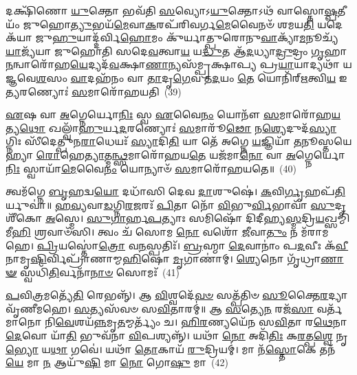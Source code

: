 𑌦𑌕𑍍𑌷𑌿᳴𑌣𑍋 \ul{𑌯𑍁}\-𑌕𑍍𑌤𑍋 𑌭𑌵᳴𑌤𑌿 \ul{𑌸}\-𑌵𑍍𑌯𑍋\-𑌽\-\ul{𑌯𑍁}\-𑌕𑍍𑌤𑍋\-𑌽𑌥᳴ 𑌵𑌾𑌸𑍍𑌤𑍋\-\ul{𑌷𑍍𑌪}\-𑌤𑍀𑌯𑌂᳴ 𑌜𑍁𑌹𑍋\-\ul{𑌤𑍍𑌯𑍁}\-𑌭𑌯᳴\-\ul{𑌮𑍇}\-𑌵𑌾\-\ul{𑌕}\-𑌰𑌪᳴𑌰𑌿𑌵𑌰𑍍𑌗\-\ul{𑌮𑍇}\-𑌵𑍈𑌨𑍞᳴ 𑌶𑌮𑌯\-\ul{𑌤𑌿} 𑌯𑌦𑍇𑌕᳴𑌯𑌾 𑌜𑍁\-\ul{𑌹𑍁}\-𑌯𑌾𑌦𑍍𑌦᳴𑌰𑍍𑌵𑌿\-\ul{𑌹𑍋}\-𑌮𑌂 𑌕𑍁᳴𑌰𑍍𑌯𑌾𑌤𑍍𑌪𑍁𑌰𑍋𑌨𑍁\-\ul{𑌵𑌾}\-𑌕𑍍𑌯𑌾᳴\-\ul{𑌮}\-𑌨𑍂𑌚𑍍𑌯᳴ \ul{𑌯𑌾}\-𑌜𑍍𑌯᳴𑌯𑌾 𑌜𑍁𑌹𑍋𑌤𑌿 𑌸𑌦𑍇\-\ul{𑌵}\-𑌤𑍍𑌵𑌾\-\ul{𑌯} 𑌯\-\ul{𑌦𑍍𑌧𑍁}\-𑌤 𑌆᳴\-\ul{𑌦}\-𑌧𑍍𑌯𑌾\-\ul{𑌦𑍍𑌰𑍁}\-𑌦𑍍𑌰𑌂 \ul{𑌗𑍃}\-𑌹𑌾\-\ul{𑌨}\-𑌨𑍍𑌵𑌾𑌰𑍋᳴𑌹\-\ul{𑌯𑍇}\-𑌦𑍍𑌯𑌦᳴\-\ul{𑌵}\-\-𑌕𑍍𑌷𑌾\-\ul{𑌣𑌾}\-𑌨𑍍𑌯𑌸᳴𑌮𑍍𑌪𑍍𑌰𑌕𑍍𑌷𑌾𑌪𑍍𑌯 𑌪𑍍𑌰\-\ul{𑌯𑌾}\-𑌯𑌾𑌦𑍍𑌯𑌥𑌾᳴ 𑌯𑌜𑍍𑌞𑌵𑍇\-\ul{𑌶}\-𑌸𑌂 \ul{𑌵𑌾}\-𑌦𑌹᳴𑌨𑌂 𑌵𑌾 \ul{𑌤𑌾}\-𑌦𑍃\-\ul{𑌗𑍇}\-𑌵 𑌤\-\ul{𑌦}\-𑌯𑌂 \ul{𑌤𑍇} 𑌯𑍋𑌨𑌿᳴𑌰𑍍\mbox{}\-\ul{𑌋}\-𑌤𑍍𑌵𑌿\-\ul{𑌯} 𑌇\-\ul{𑌤𑍍𑌯}\-𑌰𑌣𑍍𑌯𑍋𑌃॑ \ul{𑌸}\-𑌮𑌾𑌰𑍋᳴𑌹𑌯𑌤𑌿~(39)

\-\ul{𑌏}\-𑌷 𑌵𑌾 \ul{𑌅}\-𑌗𑍍𑌨𑍇𑌰𑍍𑌯𑍋\-\ul{𑌨𑌿𑌃} 𑌸𑍍𑌵 \ul{𑌏}\-𑌵𑍈\-\ul{𑌨𑌂} 𑌯𑍋𑌨𑍗᳴ \ul{𑌸}\-𑌮𑌾𑌰𑍋᳴𑌹\-\ul{𑌯}\-𑌤𑍍𑌯\-\ul{𑌥𑍋} 𑌖𑌲𑍍𑌵𑌾᳴\-\ul{𑌹𑍁}\-𑌰𑍍𑌯\-\ul{𑌦}\-𑌰𑌣𑍍𑌯𑍋𑌃॑ \ul{𑌸}\-𑌮𑌾𑌰𑍂᳴\-\ul{𑌢𑍋} 𑌨\-\ul{𑌶𑍍𑌯𑍇}\-𑌦𑍁𑌦᳴\-\ul{𑌸𑍍𑌯𑌾}\-𑌗𑍍𑌨𑌿𑌃 𑌸𑍀᳴𑌦𑍇𑌤𑍍𑌪𑍁𑌨\-\ul{𑌰𑌾}\-𑌧𑍇𑌯𑌃᳴ \ul{𑌸𑍍𑌯𑌾}\-𑌦𑌿\-\ul{𑌤𑌿} 𑌯𑌾 𑌤𑍇᳴ 𑌅𑌗𑍍𑌨𑍇 \ul{𑌯}\-𑌜𑍍𑌞𑌿𑌯𑌾᳴ \ul{𑌤}\-𑌨𑍂𑌸𑍍𑌤𑌯𑍇𑌹𑍍𑌯𑌾 \ul{𑌰𑍋}\-𑌹𑍇\-\ul{𑌤𑍍𑌯𑌾}\-𑌤𑍍𑌮\-\ul{𑌨𑍍𑌥𑍍𑌸}\-𑌮𑌾𑌰𑍋᳴𑌹𑌯\-\ul{𑌤𑍇} 𑌯𑌜᳴𑌮𑌾\-\ul{𑌨𑍋} 𑌵𑌾 \ul{𑌅}\-𑌗𑍍𑌨𑍇𑌰𑍍𑌯𑍋\-\ul{𑌨𑌿𑌃} 𑌸𑍍𑌵𑌾𑌯𑌾᳴\-\ul{𑌮𑍇}\-𑌵𑍈\-\ul{𑌨𑌂} 𑌯𑍋𑌨𑍍𑌯𑌾𑍞᳴ \ul{𑌸}\-𑌮𑌾𑌰𑍋᳴𑌹𑌯𑌤𑍇॥~(40)

{\anuvakamend[{\-\ul{𑌧}\-\-\ul{𑌤𑍍𑌤𑍇}\-\-𑌽\-\ul{𑌰𑍍𑌵𑌾}\-𑌚𑍀𑌨𑍟᳴ 𑌸𑍍𑌯𑌾\-\ul{𑌥𑍍𑌸}\-𑌮𑌾𑌰𑍋᳴𑌹𑌯\-\ul{𑌤𑌿} 𑌪𑌞𑍍𑌚᳴𑌚𑌤𑍍𑌵𑌾𑌰𑌿𑍞𑌶𑌚𑍍𑌚}]}%

𑌤𑍍𑌵𑌮᳴𑌗𑍍𑌨𑍇 \ul{𑌬𑍃}\-𑌹𑌦𑍍𑌵\-\ul{𑌯𑍋} 𑌦𑌧𑌾᳴𑌸𑌿 𑌦𑍇𑌵 \ul{𑌦𑌾}\-𑌶𑍁𑌷𑍇॑। \ul{𑌕}\-𑌵𑌿\-\ul{𑌰𑍍𑌗𑍃}\-𑌹𑌪᳴\-\ul{𑌤𑌿}\-𑌰𑍍𑌯𑍁𑌵𑌾॑॥ \ul{𑌹}\-\-\ul{𑌵𑍍𑌯}\-𑌵𑌾\-\ul{𑌡}\-𑌗𑍍𑌨𑌿\-\ul{𑌰}\-𑌜𑌰𑌃᳴ \ul{𑌪𑌿}\-𑌤𑌾 𑌨𑍋᳴ \ul{𑌵𑌿}\-𑌭𑍁\-\ul{𑌰𑍍𑌵𑌿}\-𑌭𑌾𑌵𑌾᳴ \ul{𑌸𑍁}\-𑌦𑍃𑌶𑍀᳴𑌕𑍋 \ul{𑌅}\-𑌸𑍍𑌮𑍇। \ul{𑌸𑍁}\-\-\ul{𑌗𑌾}\-𑌰𑍍\mbox{}\-\ul{𑌹}\-\-\ul{𑌪}\-𑌤𑍍𑌯𑌾𑌃 𑌸𑌮𑌿𑌷𑍋᳴ 𑌦𑌿𑌦𑍀𑌹𑍍𑌯\-\ul{𑌸𑍍𑌮}\-𑌦𑍍𑌰𑌿\-\ul{𑌯}\-𑌖𑍍𑌸𑌮𑍍𑌮𑌿᳴𑌮𑍀\-\ul{𑌹𑌿} 𑌶𑍍𑌰𑌵𑌾𑍞᳴𑌸𑌿। 𑌤𑍍𑌵𑌂 𑌚᳴ 𑌸𑍋𑌮 \ul{𑌨𑍋} 𑌵𑌶𑍋᳴ \ul{𑌜𑍀}\-𑌵𑌾\-\ul{𑌤𑍁𑌂} 𑌨 𑌮᳴𑌰𑌾𑌮𑌹𑍇। \ul{𑌪𑍍𑌰𑌿}\-𑌯𑌸𑍍𑌤𑍋॑\-\ul{𑌤𑍍𑌰𑍋} 𑌵\-\ul{𑌨}\-𑌸𑍍𑌪𑌤𑌿𑌃᳴। \ul{𑌬𑍍𑌰}\-𑌹𑍍𑌮𑌾 \ul{𑌦𑍇}\-𑌵𑌾𑌨𑌾𑌂॑ 𑌪\-\ul{𑌦}\-𑌵𑍀𑌃 𑌕᳴\-\ul{𑌵𑍀}\-𑌨𑌾𑌮𑍃\-\ul{𑌷𑌿}\-𑌰𑍍𑌵𑌿𑌪𑍍𑌰𑌾᳴𑌣𑌾𑌮𑍍𑌮\-\ul{𑌹𑌿}\-𑌷𑍋 \ul{𑌮𑍃}\-𑌗𑌾𑌣𑌾॑𑌮𑍍। \ul{𑌶𑍍𑌯𑍇}\-𑌨𑍋 𑌗𑍃᳴𑌧𑍍𑌰𑌾\-\ul{𑌣𑌾}\-\-\ul{𑍟} 𑌸𑍍𑌵𑌧𑌿᳴\-\ul{𑌤𑌿}\-𑌰𑍍𑌵𑌨𑌾᳴\-\ul{𑌨𑌾}\-\-\ul{𑍞} 𑌸𑍋𑌮𑌃᳴~(41)

\-\ul{𑌪}\-𑌵𑌿\-\ul{𑌤𑍍𑌰}\-𑌮𑌤𑍍𑌯𑍇᳴\-\ul{𑌤𑌿} 𑌰𑍇𑌭𑌨𑍍𑌨𑍍᳴। 𑌆 \ul{𑌵𑌿}\-𑌶𑍍𑌵𑌦𑍇᳴\-\ul{𑌵}\-\-\ul{𑍞} 𑌸𑌤𑍍𑌪᳴𑌤𑌿𑍞 \ul{𑌸𑍂}\-𑌕𑍍𑌤𑍈\-\ul{𑌰}\-𑌦𑍍𑌯𑌾 𑌵𑍃᳴𑌣𑍀𑌮𑌹𑍇। \ul{𑌸}\-𑌤𑍍𑌯𑌸᳴𑌵𑍞 𑌸\-\ul{𑌵𑌿}\-𑌤𑌾𑌰𑌮𑍍॑॥ 𑌆 \ul{𑌸}\-𑌤𑍍𑌯𑍇\-\ul{𑌨} 𑌰𑌜᳴\-\ul{𑌸𑌾} 𑌵𑌰𑍍𑌤᳴𑌮𑌾𑌨𑍋 𑌨𑌿\-\ul{𑌵𑍇}\-𑌶𑌯᳴\-\ul{𑌨𑍍𑌨}\-𑌮𑍃\-\ul{𑌤}\-𑌮𑍍𑌮𑌰𑍍𑌤𑍍𑌯𑌂᳴ 𑌚। \ul{𑌹𑌿}\-\-\ul{𑌰}\-𑌣𑍍𑌯𑌯𑍇᳴𑌨 𑌸\-\ul{𑌵𑌿}\-𑌤𑌾 𑌰\-\ul{𑌥𑍇}\-𑌨𑌾 \ul{𑌦𑍇}\-𑌵𑍋 𑌯𑌾᳴\-\ul{𑌤𑌿} 𑌭𑍁𑌵᳴𑌨𑌾 \ul{𑌵𑌿}\-𑌪𑌶𑍍𑌯𑌨𑍍𑌨𑍍᳴। 𑌯𑌥𑌾᳴ \ul{𑌨𑍋} 𑌅𑌦𑌿᳴\-\ul{𑌤𑌿𑌃} 𑌕\-\ul{𑌰}\-𑌤𑍍𑌪\-\ul{𑌶𑍍𑌵𑍇} 𑌨𑍃\-\ul{𑌭𑍍𑌯𑍋} 𑌯\-\ul{𑌥𑌾} 𑌗𑌵𑍇॑। 𑌯𑌥𑌾᳴ \ul{𑌤𑍋}\-𑌕𑌾𑌯᳴ \ul{𑌰𑍁}\-𑌦𑍍𑌰𑌿𑌯𑌮𑍍॑। 𑌮𑌾 𑌨᳴\-\ul{𑌸𑍍𑌤𑍋}\-𑌕𑍇 𑌤𑌨᳴\-\ul{𑌯𑍇} 𑌮𑌾 \ul{𑌨} 𑌆𑌯𑍁᳴\-\ul{𑌷𑌿} 𑌮𑌾 \ul{𑌨𑍋} 𑌗𑍋\-\ul{𑌷𑍁} 𑌮𑌾~(42)

